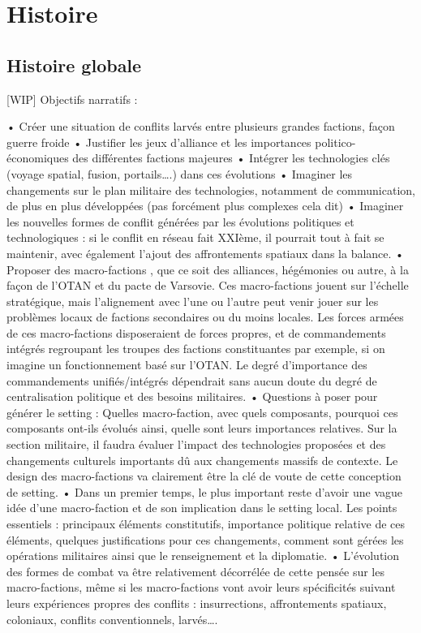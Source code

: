 \documentclass[10pt,a4paper]{book}
\begin{document}
\chapter{Histoire}
\begin{multicols}{2}
\section{Histoire globale}
[WIP]
Objectifs narratifs : 

	• Créer une situation de conflits larvés entre plusieurs grandes factions, façon guerre froide
	• Justifier les jeux d'alliance et les importances politico-économiques des différentes factions majeures
	• Intégrer les technologies clés (voyage spatial, fusion, portails….) dans ces évolutions
	• Imaginer les changements sur le plan militaire des technologies, notamment de communication, de plus en plus développées (pas forcément plus complexes cela dit)
	• Imaginer les nouvelles formes de conflit générées par les évolutions politiques et technologiques : si le conflit en réseau fait XXIème, il pourrait tout à fait se maintenir, avec également l'ajout des affrontements spatiaux dans la balance.
	• Proposer des macro-factions , que ce soit des alliances, hégémonies ou autre, à la façon de l'OTAN et du pacte de Varsovie. Ces macro-factions jouent sur l'échelle stratégique, mais l'alignement avec l'une ou l'autre peut venir jouer sur les problèmes locaux de factions secondaires ou du moins locales. Les forces armées de ces macro-factions disposeraient de forces propres, et de commandements intégrés regroupant les troupes des factions constituantes par exemple, si on imagine un fonctionnement basé sur l'OTAN. Le degré d'importance des commandements unifiés/intégrés dépendrait sans aucun doute du degré de centralisation politique et des besoins militaires.
	• Questions à poser pour générer le setting : Quelles macro-faction, avec quels composants, pourquoi ces composants ont-ils évolués ainsi, quelle sont leurs importances relatives. Sur la section militaire, il faudra évaluer l'impact des technologies proposées et des changements culturels importants dû aux changements massifs de contexte. Le design des macro-factions va clairement être la clé de voute de cette conception de setting. 
	• Dans un premier temps, le plus important reste d'avoir une vague idée d'une macro-faction et de son implication dans le setting local. Les points essentiels : principaux éléments constitutifs, importance politique relative de ces éléments, quelques justifications pour ces changements, comment sont gérées les opérations militaires ainsi que le renseignement et la diplomatie. 
	• L'évolution des formes de combat va être relativement décorrélée de cette pensée sur les macro-factions, même si les macro-factions vont avoir leurs spécificités suivant leurs expériences propres des conflits : insurrections, affrontements spatiaux, coloniaux, conflits conventionnels, larvés….


\end{multicols}
\end{document}
